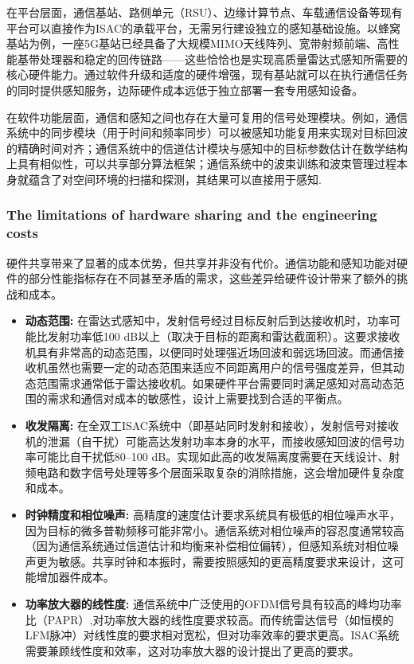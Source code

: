 在平台层面，通信基站、路侧单元（RSU）、边缘计算节点、车载通信设备等现有平台可以直接作为ISAC的承载平台，无需另行建设独立的感知基础设施。以蜂窝基站为例，一座5G基站已经具备了大规模MIMO天线阵列、宽带射频前端、高性能基带处理器和稳定的回传链路——这些恰恰也是实现高质量雷达式感知所需要的核心硬件能力。通过软件升级和适度的硬件增强，现有基站就可以在执行通信任务的同时提供感知服务，边际硬件成本远低于独立部署一套专用感知设备。

在软件功能层面，通信和感知之间也存在大量可复用的信号处理模块。例如，通信系统中的同步模块（用于时间和频率同步）可以被感知功能复用来实现对目标回波的精确时间对齐；通信系统中的信道估计模块与感知中的目标参数估计在数学结构上具有相似性，可以共享部分算法框架；通信系统中的波束训练和波束管理过程本身就蕴含了对空间环境的扫描和探测，其结果可以直接用于感知.

\subsubsection{The limitations of hardware sharing and the engineering costs}
\label{subsubsec:ch1-isac-core value-hardware-limitations}

硬件共享带来了显著的成本优势，但共享并非没有代价。通信功能和感知功能对硬件的部分性能指标存在不同甚至矛盾的需求，这些差异给硬件设计带来了额外的挑战和成本。

\begin{itemize}
\item\textbf{动态范围:} 在雷达式感知中，发射信号经过目标反射后到达接收机时，功率可能比发射功率低100 dB以上（取决于目标的距离和雷达截面积）。这要求接收机具有非常高的动态范围，以便同时处理强近场回波和弱远场回波。而通信接收机虽然也需要一定的动态范围来适应不同距离用户的信号强度差异，但其动态范围需求通常低于雷达接收机。如果硬件平台需要同时满足感知对高动态范围的需求和通信对成本的敏感性，设计上需要找到合适的平衡点。

\item\textbf{收发隔离:} 在全双工ISAC系统中（即基站同时发射和接收），发射信号对接收机的泄漏（自干扰）可能高达发射功率本身的水平，而接收感知回波的信号功率可能比自干扰低80–100 dB。实现如此高的收发隔离度需要在天线设计、射频电路和数字信号处理等多个层面采取复杂的消除措施，这会增加硬件复杂度和成本。

\item\textbf{时钟精度和相位噪声:} 高精度的速度估计要求系统具有极低的相位噪声水平，因为目标的微多普勒频移可能非常小。通信系统对相位噪声的容忍度通常较高（因为通信系统通过信道估计和均衡来补偿相位偏转），但感知系统对相位噪声更为敏感。共享时钟和本振时，需要按照感知的更高精度要求来设计，这可能增加器件成本。

\item\textbf{功率放大器的线性度:} 通信系统中广泛使用的OFDM信号具有较高的峰均功率比（PAPR）,对功率放大器的线性度要求较高。而传统雷达信号（如恒模的LFM脉冲）对线性度的要求相对宽松，但对功率效率的要求更高。ISAC系统需要兼顾线性度和效率，这对功率放大器的设计提出了更高的要求。
\end{itemize}

